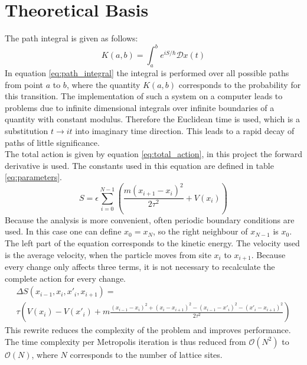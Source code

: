 \documentclass{scrartcl}
\begin{document}
	\section{Theoretical Basis}
		The path integral is given as follows:
		\begin{equation}
			K(a, b) = \int_a^b e^{iS/\hbar} \mathcal Dx(t)
			\label{eq:path_integral}
		\end{equation}
		In equation \ref{eq:path_integral} the integral is performed over all possible paths from point $a$ to $b$, where the quantity $K(a, b)$ corresponds to the probability for this transition.
		The implementation of such a system on a computer leads to problems due to infinite dimensional integrals over infinite boundaries of a quantity with constant modulus.
		Therefore the Euclidean time is used, which is a substitution $t \rightarrow i t$ into imaginary time direction.
		This leads to a rapid decay of paths of little significance.
		\\
		The total action is given by equation \ref{eq:total_action}, in this project the forward derivative is used.
		The constants used in this equation are defined in table \ref{eq:parameters}.
		\begin{equation}
			S = \epsilon \sum_{i=0}^{N - 1} \left(\frac{m(x_{i+1} - x_i)^2}{2\tau^2} + V(x_i)\right)
			\label{eq:total_action}
		\end{equation}
		Because the analysis is more convenient, often periodic boundary conditions are used.
		In this case one can define $x_0 = x_N$, so the right neighbour of $x_{N-1}$ is $x_0$.
		The left part of the equation corresponds to the kinetic energy.
		The velocity used is the average velocity, when the particle moves from site $x_i$ to $x_{i+1}$.
		Because every change only affects three terms, it is not necessary to recalculate the complete action for every change.
		\begin{equation}
			\begin{split}
				\Delta S(x_{i-1}, x_i, x'_i, x_{i+1}) =\\
				\tau\left(V(x_i) - V(x'_i) + m\frac{(x_{i-1} - x_i)^2 + (x_i - x_{i+1})^2 - (x_{i-1} - x'_i)^2 - (x'_i - x_{i+1})^2}{2\tau^2}\right)
			\end{split}
			\label{eq:delta_total_action}
		\end{equation}
		This rewrite reduces the complexity of the problem and improves performance.
		The time complexity per Metropolis iteration is thus reduced from $\mathcal O(N^2)$ to $\mathcal O(N)$, where $N$ corresponds to the number of lattice sites.
\end{document}

